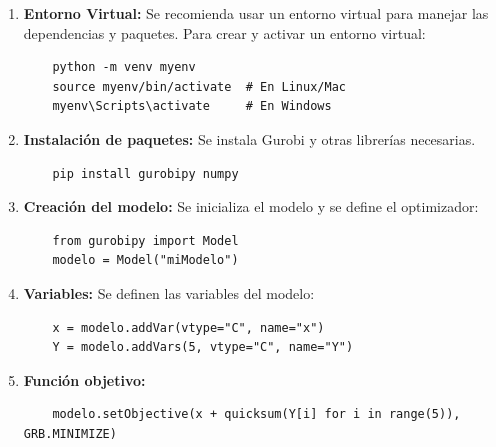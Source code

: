 \begin{enumerate}
    \item \textbf{Entorno Virtual:} Se recomienda usar un entorno virtual para manejar las dependencias y paquetes. Para crear y activar un entorno virtual:

    \begin{footnotesize}
    \begin{lstlisting}
    python -m venv myenv
    source myenv/bin/activate  # En Linux/Mac
    myenv\Scripts\activate     # En Windows
    \end{lstlisting}
    \end{footnotesize}
    
    \item \textbf{Instalación de paquetes:} Se instala Gurobi y otras librerías necesarias.

    \begin{footnotesize}
    \begin{lstlisting}
    pip install gurobipy numpy
    \end{lstlisting}
    \end{footnotesize}
    
    \item \textbf{Creación del modelo:} Se inicializa el modelo y se define el optimizador:

    \begin{footnotesize}
    \begin{lstlisting}
    from gurobipy import Model
    modelo = Model("miModelo")
    \end{lstlisting}
    \end{footnotesize}
    
    \item \textbf{Variables:} Se definen las variables del modelo:

    \begin{footnotesize}
    \begin{lstlisting}
    x = modelo.addVar(vtype="C", name="x")
    Y = modelo.addVars(5, vtype="C", name="Y")
    \end{lstlisting}
    \end{footnotesize}
    
    \item \textbf{Función objetivo:}

    \begin{footnotesize}
    \begin{lstlisting}
    modelo.setObjective(x + quicksum(Y[i] for i in range(5)), GRB.MINIMIZE)
    \end{lstlisting}
    \end{footnotesize}
    

\end{enumerate}
